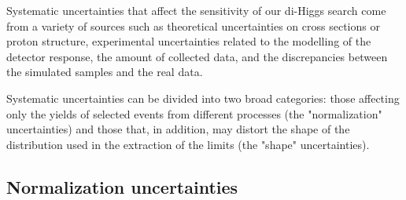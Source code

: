 Systematic uncertainties that affect the sensitivity of our di-Higgs search
come from a variety of sources such as theoretical uncertainties on
cross sections or proton structure, experimental uncertainties related
to the modelling of the detector response, the amount of collected
data, and the discrepancies between the simulated samples and the real data.











Systematic uncertainties can be divided into two broad categories:
those affecting only the yields of selected events from different processes
(the "normalization" uncertainties) and those that, in addition, may
distort the shape of the \mTHH distribution used in the extraction of
the limits (the "shape" uncertainties). %

\subsection{Normalization uncertainties}


